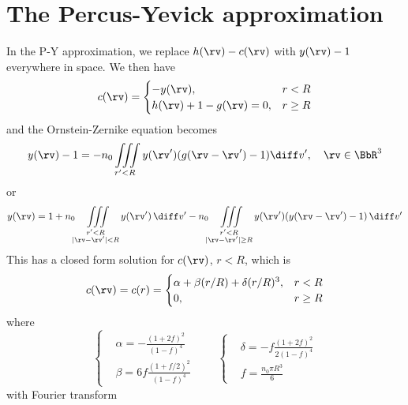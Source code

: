\documentclass[12pt,a4paper]{article}
\newcommand{\numden}{n_{0}}
\begin{document}
\section{The Percus-Yevick approximation}
In the P-Y approximation, we replace $h(\rv)-c(\rv)$ with $y(\rv)-1$ everywhere in space.
We then have
\begin{equation*}
  c(\rv)=\begin{cases}
           -y(\rv), & r<R \\
           h(\rv)+1-g(\rv)=0, & r\geq R
         \end{cases}
\end{equation*}
and the Ornstein-Zernike equation becomes
\begin{equation*}
  y(\rv)-1=-\numden\iiint\limits_{r'<R}y(\rv')(g(\rv-\rv')-1)\diff v',\quad \rv\in\BbR^3
\end{equation*}
or
\begin{equation*}
  y(\rv)=1+\numden\iiint\limits_{\substack{r'<R\\|\rv-\rv'|<R}}y(\rv')\,\diff v'-\numden\iiint\limits_{\substack{r'<R\\|\rv-\rv'|\geq R}}y(\rv')(y(\rv-\rv')-1)\,\diff v'
\end{equation*}
This has a closed form solution for $c(\rv)$, $r<R$, which is~\cite{Wertheim1963}
\begin{equation*}
  c(\rv)=c(r)=\begin{cases}
           \alpha+\beta (r/R)+\delta(r/R)^3, & r<R \\
           0, & r\geq R
         \end{cases}
\end{equation*}
where
\begin{equation*}
  \left\{\begin{aligned}
           &\alpha=-\frac{(1+2f)^2}{(1-f)^4}\\
           &\beta=6f\frac{(1+f/2)^2}{(1-f)^4}
         \end{aligned}\right.\qquad
         \left\{\begin{aligned}
           &\delta=-f\frac{(1+2f)^2}{2(1-f)^4}\\
           &f=\frac{\numden\pi R^3}{6}
         \end{aligned}\right.
\end{equation*}
with Fourier transform
\end{document}
